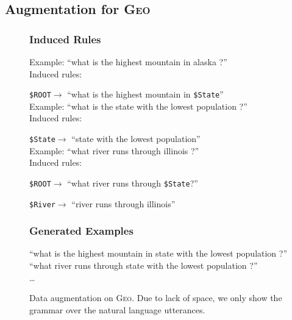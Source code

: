 \documentclass[11pt,letterpaper]{article}
\newcommand{\geo}{\textsc{Geo}\xspace}
\newcommand{\catroot}{\texttt{\$ROOT}\xspace}
\newcommand{\catstate}{\texttt{\$State}\xspace}
\newcommand{\catriver}{\texttt{\$River}\xspace}
\begin{document}


\subsection{Augmentation for \geo}
\begin{figure}[t] 
\small
\begin{framed}
\footnotesize
\subsubsection*{Induced Rules}
Example: ``what is the highest mountain in alaska ?''\\
Induced rules:

\quad \catroot $\to$ ``what is the highest mountain in \catstate ''\\

Example: ``what is the state with the lowest population ?''\\
Induced rules:

\quad \catstate $\to$ ``state with the lowest population''\\

Example: ``what river runs through illinois ?''\\
Induced rules:

\quad \catroot $\to$ ``what river runs through \catstate ?''

\quad \catriver $\to$ ``river runs through illinois''

\subsubsection*{Generated Examples} 
``what is the highest mountain in state with the lowest population ?'' \\
``what river runs through state with the lowest population ?'' \\
\dots
\end{framed}
\caption{Data augmentation on \geo.  Due to lack of space,
we only show the grammar over the natural language utterances.}
\label{fig:augment-geo}
\end{figure}
\end{document}
